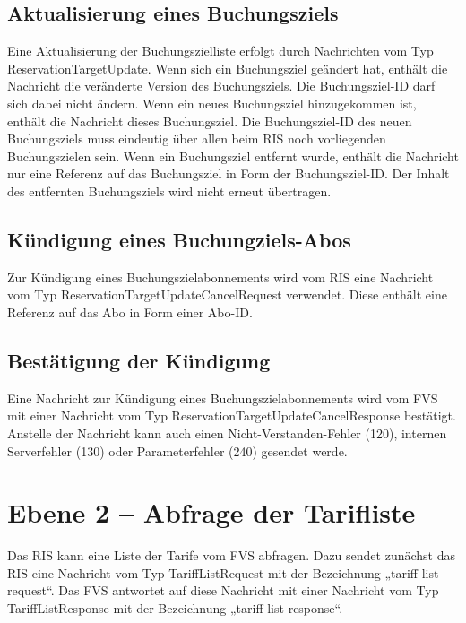 \subsection{Aktualisierung eines Buchungsziels}
Eine Aktualisierung der Buchungszielliste erfolgt durch Nachrichten vom Typ ReservationTargetUpdate. Wenn sich ein Buchungsziel geändert hat, enthält die Nachricht die veränderte Version des Buchungsziels. Die Buchungsziel-ID darf sich dabei nicht ändern. Wenn ein neues Buchungsziel hinzugekommen ist, enthält die Nachricht dieses Buchungsziel. Die Buchungsziel-ID des neuen Buchungsziels muss eindeutig über allen beim RIS noch vorliegenden Buchungszielen sein. Wenn ein Buchungsziel entfernt wurde, enthält die Nachricht nur eine Referenz auf das Buchungsziel in Form der Buchungsziel-ID. Der Inhalt des entfernten Buchungsziels wird nicht erneut übertragen.



\subsection{Kündigung eines Buchungziels-Abos}
Zur Kündigung eines Buchungszielabonnements wird vom RIS eine Nachricht vom Typ ReservationTargetUpdateCancelRequest verwendet. Diese enthält eine Referenz auf das Abo in Form einer Abo-ID.



\subsection{Bestätigung der Kündigung}
Eine Nachricht zur Kündigung eines Buchungszielabonnements wird vom FVS mit einer Nachricht vom Typ ReservationTargetUpdateCancelResponse bestätigt. Anstelle der  Nachricht kann auch einen Nicht-Verstanden-Fehler (120), internen Serverfehler (130) oder Parameterfehler (240) gesendet werde.




\section{Ebene 2 -- Abfrage der Tarifliste}
Das RIS kann eine Liste der Tarife vom FVS abfragen. Dazu sendet zunächst das RIS eine Nachricht vom Typ TariffListRequest mit der Bezeichnung „tariff-list-request“. Das FVS antwortet auf diese Nachricht mit einer Nachricht vom Typ TariffListResponse mit der Bezeichnung „tariff-list-response“.

